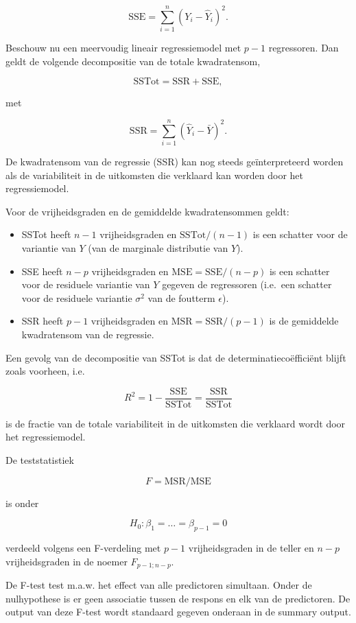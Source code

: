 \documentclass[
  12pt,dutch]{book}
\providecommand{\tightlist}{%
  \setlength{\itemsep}{0pt}\setlength{\parskip}{0pt}}
\theoremstyle{definition}
\theoremstyle{definition}
\theoremstyle{definition}
\theoremstyle{definition}
\theoremstyle{remark}
\begin{document}
\[
  \text{SSE} = \sum_{i=1}^n (Y_i-\hat{Y}_i)^2.
\]

Beschouw nu een meervoudig lineair regressiemodel met \(p-1\) regressoren. Dan geldt de volgende decompositie van de totale kwadratensom,

\[
  \text{SSTot} = \text{SSR} + \text{SSE} ,
\]

met

\[
  \text{SSR} = \sum_{i=1}^n (\hat{Y}_i-\bar{Y})^2.
\]

De kwadratensom van de regressie (SSR) kan nog steeds geïnterpreteerd worden als de variabiliteit in de uitkomsten die verklaard kan worden door het regressiemodel.

Voor de vrijheidsgraden en de gemiddelde kwadratensommen geldt:

\begin{itemize}
\tightlist
\item
  SSTot heeft \(n-1\) vrijheidsgraden en \(\text{SSTot}/(n-1)\) is een schatter voor de variantie van \(Y\) (van de marginale distributie van \(Y\)).
\item
  SSE heeft \(n-p\) vrijheidsgraden en \(\text{MSE}=\text{SSE}/(n-p)\) is een schatter voor de residuele variantie van \(Y\) gegeven de regressoren (i.e.~een schatter voor de residuele variantie \(\sigma^2\) van de foutterm \(\epsilon\)).
\item
  SSR heeft \(p-1\) vrijheidsgraden en \(\text{MSR}=\text{SSR}/(p-1)\) is de gemiddelde kwadratensom van de regressie.
\end{itemize}

Een gevolg van de decompositie van SSTot is dat de determinatiecoëfficiënt blijft zoals voorheen, i.e.

\[
  R^2 = 1-\frac{\text{SSE}}{\text{SSTot}} = \frac{\text{SSR}}{\text{SSTot}}
\]

is de fractie van de totale variabiliteit in de uitkomsten die verklaard wordt door het regressiemodel.

De teststatistiek

\[
F=\text{MSR}/\text{MSE}
\]

is onder

\[H_0:\beta_1=\ldots=\beta_{p-1}=0\]

verdeeld volgens een F-verdeling met \(p-1\) vrijheidsgraden in de teller en \(n-p\) vrijheidsgraden in de noemer \(F_{p-1;n-p}\).

De F-test test m.a.w. het effect van alle predictoren simultaan. Onder de nulhypothese is er geen associatie tussen de respons en elk van de predictoren. De output van deze F-test wordt standaard gegeven onderaan in de summary output.
\end{document}
